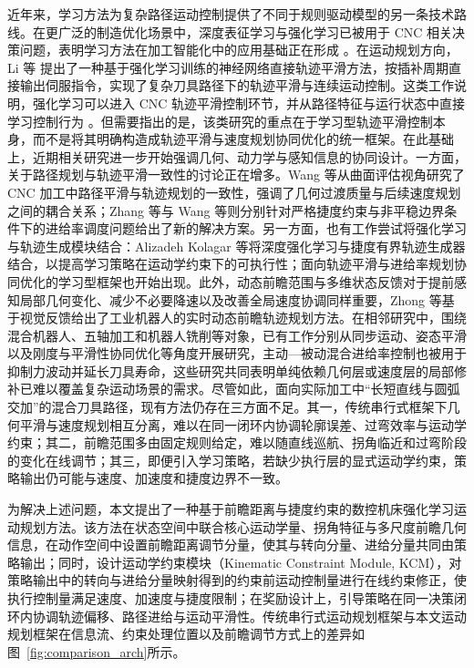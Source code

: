 \documentclass[preprint,12pt]{elsarticle}
\begin{document}
近年来，学习方法为复杂路径运动控制提供了不同于规则驱动模型的另一条技术路线。在更广泛的制造优化场景中，深度表征学习与强化学习已被用于 CNC 相关决策问题，表明学习方法在加工智能化中的应用基础正在形成 \cite{Samsonov2023}。在运动规划方向，Li 等 \cite{Li2020} 提出了一种基于强化学习训练的神经网络直接轨迹平滑方法，按插补周期直接输出伺服指令，实现了复杂刀具路径下的轨迹平滑与连续运动控制。这类工作说明，强化学习可以进入 CNC 轨迹平滑控制环节，并从路径特征与运行状态中直接学习控制行为 \cite{Li2020}。但需要指出的是，该类研究的重点在于学习型轨迹平滑控制本身，而不是将其明确构造成轨迹平滑与速度规划协同优化的统一框架。在此基础上，近期相关研究进一步开始强调几何、动力学与感知信息的协同设计。一方面，关于路径规划与轨迹平滑一致性的讨论正在增多。Wang 等\cite{Wang2025}从曲面评估视角研究了 CNC 加工中路径平滑与轨迹规划的一致性，强调了几何过渡质量与后续速度规划之间的耦合关系；Zhang 等\cite{Zhang2026}与 Wang 等\cite{Wang2025b}则分别针对严格捷度约束与非平稳边界条件下的进给率调度问题给出了新的解决方案。另一方面，也有工作尝试将强化学习与轨迹生成模块结合：Alizadeh Kolagar 等\cite{Alizadeh2024}将深度强化学习与捷度有界轨迹生成器结合，以提高学习策略在运动学约束下的可执行性；面向轨迹平滑与进给率规划协同优化的学习型框架也开始出现\cite{KIRL2025}。此外，动态前瞻范围与多维状态反馈对于提前感知局部几何变化、减少不必要降速以及改善全局速度协调同样重要，Zhong 等\cite{Zhong2025}基于视觉反馈给出了工业机器人的实时动态前瞻轨迹规划方法。在相邻研究中，围绕混合机器人、五轴加工和机器人铣削等对象，已有工作分别从同步运动\cite{Zhang2024b}、姿态平滑\cite{Liu2024}以及刚度与平滑性协同优化\cite{Chen2024}等角度开展研究，主动—被动混合进给率控制也被用于抑制力波动并延长刀具寿命\cite{Li2024}，这些研究共同表明单纯依赖几何层或速度层的局部修补已难以覆盖复杂运动场景的需求。尽管如此，面向实际加工中“长短直线与圆弧交加”的混合刀具路径，现有方法仍存在三方面不足。其一，传统串行式框架下几何平滑与速度规划相互分离\cite{Sun2022,Yan2023}，难以在同一闭环内协调轮廓误差、过弯效率与运动学约束；其二，前瞻范围多由固定规则给定，难以随直线巡航、拐角临近和过弯阶段的变化在线调节；其三，即便引入学习策略，若缺少执行层的显式运动学约束，策略输出仍可能与速度、加速度和捷度边界不一致\cite{Li2020,Alizadeh2024,KIRL2025}。

为解决上述问题，本文提出了一种基于前瞻距离与捷度约束的数控机床强化学习运动规划方法。该方法在状态空间中联合核心运动学量、拐角特征与多尺度前瞻几何信息，在动作空间中设置前瞻距离调节分量，使其与转向分量、进给分量共同由策略输出；同时，设计运动学约束模块（Kinematic Constraint Module, KCM），对策略输出中的转向与进给分量映射得到的约束前运动控制量进行在线约束修正，使执行控制量满足速度、加速度与捷度限制；在奖励设计上，引导策略在同一决策闭环内协调轨迹偏移、路径进给与运动平滑性。传统串行式运动规划框架与本文运动规划框架在信息流、约束处理位置以及前瞻调节方式上的差异如图~\ref{fig:comparison_arch}所示。
\end{document}
